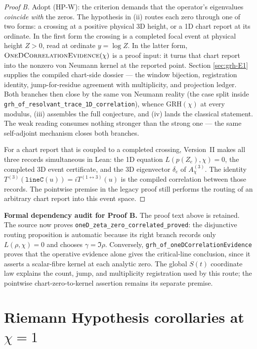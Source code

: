 \documentclass[11pt]{article}
\theoremstyle{definition}
\begin{document}
\begin{proof}[Proof B]
Adopt (HP-W): the criterion demands that the operator's eigenvalues
\emph{coincide with} the zeros. The hypothesis in \textup{(ii)} routes each
zero through one of two forms: a crossing at a positive physical 3D height,
or a 1D chart
report at its ordinate.  In the first form the crossing is a completed focal
event at physical height \(Z>0\), read at ordinate \(y=\log Z\). In the latter
form, \(\textsc{OneDCorrelationEvidence}(\chi)\)
is a proof input: it turns that chart report into the nonzero von Neumann
kernel at the reported point. Section \ref{sec:grh-E1} supplies the compiled
chart-side dossier --- the window bijection, registration identity,
jump-for-residue agreement with multiplicity, and projection ledger. Both
branches then close by the same von Neumann reality (the case split inside
\texttt{grh\_of\_resolvant\_trace\_1D\_correlation}), whence
\(\mathrm{GRH}(\chi)\) at every modulus, \textup{(iii)} assembles the full
conjecture, and \textup{(iv)} lands the classical statement. The weak
reading consumes nothing stronger than the strong one --- the same
self-adjoint mechanism closes both branches.

For a chart report that is coupled to a completed crossing, Version~II makes
all three records simultaneous in Lean: the 1D equation
\(L(p(Z_e),\chi)=0\), the completed 3D event certificate, and the 3D
eigenvector \(\delta_e\) of \(A^{(3)}_\chi\).  The identity
\(T^{(3)}(\texttt{lineC}(u))=iT^{(1\leftrightarrow3)}(u)\) is the compiled
correlation between those records.  The pointwise premise in the legacy proof
still performs the routing of an arbitrary chart report into this event
space.
\end{proof}

\medskip
\noindent\textbf{Formal dependency audit for Proof B.}  The proof text above
is retained.  The source now proves
\texttt{oneD\_zeta\_zero\_correlated\_proved}: the disjunctive routing
proposition is automatic because its right branch records only
\(L(\rho,\chi)=0\) and chooses \(\gamma=\Im\rho\).  Conversely,
\texttt{grh\_of\_oneDCorrelationEvidence} proves that the operative evidence
alone gives the critical-line conclusion, since it asserts a scalar-fibre
kernel at each analytic zero.  The global \(S(t)\) coordinate law explains
the count, jump, and multiplicity registration used by this route; the
pointwise chart-zero-to-kernel assertion remains its separate premise.

\section{Riemann Hypothesis corollaries at \texorpdfstring{\(\chi=1\)}{chi=1}}
\label{sec:grh-rh}
\end{document}
